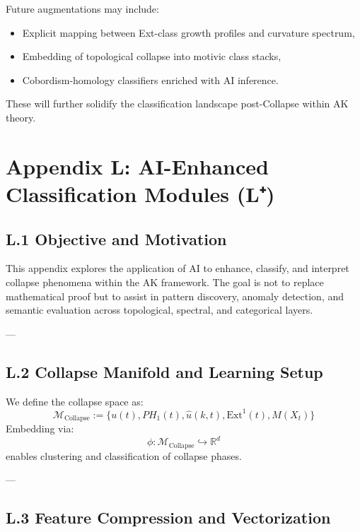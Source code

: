 \documentclass[11pt]{article}
\begin{document}
\begin{axiom}
\begin{axiom}
Future augmentations may include:
\begin{itemize}
  \item Explicit mapping between Ext-class growth profiles and curvature spectrum,
  \item Embedding of topological collapse into motivic class stacks,
  \item Cobordism-homology classifiers enriched with AI inference.
\end{itemize}

These will further solidify the classification landscape post-Collapse within AK theory.





\section*{Appendix L: AI-Enhanced Classification Modules (L⁺)}

\subsection*{L.1 Objective and Motivation}

This appendix explores the application of AI to enhance, classify, and interpret collapse phenomena within the AK framework.  
The goal is not to replace mathematical proof but to assist in pattern discovery, anomaly detection, and semantic evaluation  
across topological, spectral, and categorical layers.

---

\subsection*{L.2 Collapse Manifold and Learning Setup}

We define the collapse space as:
\[
\mathcal{M}_{\text{Collapse}} := \{ u(t), PH_1(t), \widehat{u}(k,t), \mathrm{Ext}^1(t), M(X_t) \}
\]
Embedding via:
\[
\phi: \mathcal{M}_{\text{Collapse}} \hookrightarrow \mathbb{R}^d
\]
enables clustering and classification of collapse phases.

---

\subsection*{L.3 Feature Compression and Vectorization}


\end{axiom}
\end{axiom}
\end{document}
